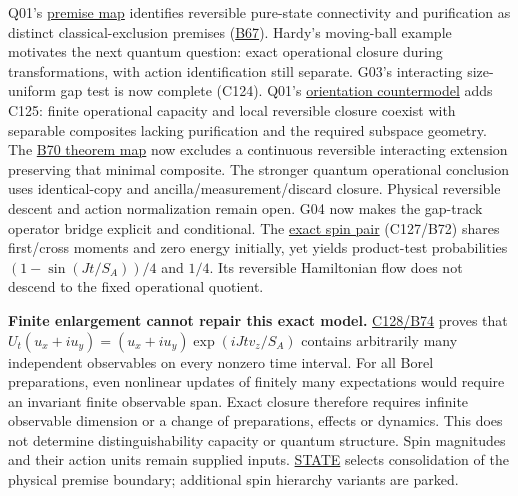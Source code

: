 \documentclass[11pt,a4paper]{article}
\begin{document}
Q01's \href{quantum-exclusion-premises.md}{premise map} identifies
reversible pure-state connectivity and purification as distinct
classical-exclusion premises (\href{../references/batches/B67.md}{B67}).
Hardy's moving-ball example motivates the next quantum question: exact
operational closure during transformations, with action identification
still separate. G03's interacting size-uniform gap test is now complete
(C124). Q01's \href{classical-orientation-closure.md}{orientation
countermodel} adds C125: finite operational capacity and local
reversible closure coexist with separable composites lacking
purification and the required subspace geometry. The
\href{reversible-interaction-premise.md}{B70 theorem map} now excludes a
continuous reversible interacting extension preserving that minimal
composite. The stronger quantum operational conclusion uses
identical-copy and ancilla/measurement/discard closure. Physical
reversible descent and action normalization remain open. G04 now makes
the gap-track operator bridge explicit and conditional. The
\href{hamiltonian-moment-descent.md}{exact spin pair} (C127/B72) shares
first/cross moments and zero energy initially, yet yields product-test
probabilities \((1-\sin(Jt/S_A))/4\) and \(1/4\). Its reversible
Hamiltonian flow does not descend to the fixed operational quotient.

\textbf{Finite enlargement cannot repair this exact model.}
\href{hamiltonian-finite-closure.md}{C128/B74} proves that
\(U_t(u_x+i u_y)=(u_x+i u_y)\exp(iJt v_z/S_A)\) contains arbitrarily
many independent observables on every nonzero time interval. For all
Borel preparations, even nonlinear updates of finitely many expectations
would require an invariant finite observable span. Exact closure
therefore requires infinite observable dimension or a change of
preparations, effects or dynamics. This does not determine
distinguishability capacity or quantum structure. Spin magnitudes and
their action units remain supplied inputs.
\href{../research/STATE.md}{STATE} selects consolidation of the physical
premise boundary; additional spin hierarchy variants are parked.
\end{document}
